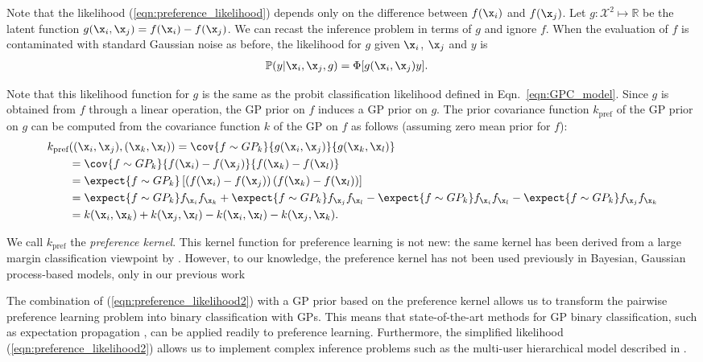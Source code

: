 Note that the likelihood (\ref{eqn:preference_likelihood}) depends only on the difference between $f(\x_i)$ and $f(\x_j)$.
Let $g:\mathcal{X}^2\mapsto\mathbb{R}$ be the latent function $g(\x_i,\x_j) = f(\x_i) - f(\x_j)$.
We can recast the inference problem in terms of $g$ and ignore $f$. When the evaluation of $f$ is contaminated with standard Gaussian noise as before, the likelihood for $g$ given $\x_i$, $\x_j$ and $y$ is
%
\begin{align}
	\mathbb{P}(y|\x_i,\x_j,g) &= \Phi[g(\x_i, \x_j)y].\label{eqn:preference_likelihood2}
\end{align}

Note that this likelihood function for $g$ is the same as the probit classification likelihood defined in Eqn.\ \eqref{eqn:GPC_model}. Since $g$ is obtained from $f$ through a linear operation, the GP prior on $f$ induces a GP prior on $g$. The prior covariance function $k_\text{pref}$ of the GP prior on $g$ can be computed from the covariance function $k$ of the GP on $f$ as follows (assuming zero mean prior for $f$):
%
\begin{align}
	k_\text{pref}&((\x_i,\x_j),(\x_k,\x_l)) = \cov{f\sim GP_k}{g(\x_i,\x_j)}{g(\x_k,\x_l)}\\
	&= \cov{f\sim GP_k}{f(\x_i)-f(\x_j)}{f(\x_k) - f(\x_l)}\\
	&= \expect{f\sim GP_k}\left[\left(f(\x_i)-f(\x_j)\right)\left(f(\x_k)-f(\x_l)\right)\right]\\
	&= \expect{f\sim GP_k}f_{\x_i}f_{\x_k} + \expect{f\sim GP_k}f_{\x_j}f_{\x_l} - \expect{f\sim GP_k}f_{\x_i}f_{\x_l} - \expect{f\sim GP_k}f_{\x_j}f_{\x_k}\\
	&= k(\x_i,\x_k) + k(\x_j,\x_l) - k(\x_i,\x_l) - k(\x_j,\x_k). \label{eqn:preference_kernel}
\end{align}

We call $k_\text{pref}$ the \emph{preference kernel}. This kernel function for preference learning is not new: the same kernel has been derived from a large margin classification viewpoint by \citet{furnkranz2010}. However, to our knowledge, the preference kernel has not been used previously in Bayesian, Gaussian process-based models, only in our previous work \citep{Houlsby2011,Houlsby2012preference}

The combination of (\ref{eqn:preference_likelihood2}) with a GP prior based on the preference kernel allows us to transform the pairwise preference learning problem into  binary classification with GPs. This means that state-of-the-art methods for GP binary classification, such as expectation propagation \citep{Minka2001}, can be applied readily to preference learning. Furthermore, the simplified likelihood (\ref{eqn:preference_likelihood2}) allows us to implement complex inference problems such as the multi-user hierarchical model described in \citep{Houlsby2012preference}.


